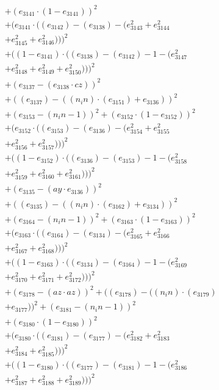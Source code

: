 \documentclass[10pt, a4paper]{article}
\begin{document}
\begin{small}
\begin{align*}
& + (e_{3141}  \cdot  (1 - e_{3141}))^{2} \\
& + (e_{3141}  \cdot  ((e_{3142}) - (e_{3138}) - (e_{3143}^{2} + e_{3144}^{2} \\
& + e_{3145}^{2} + e_{3146}^{2})))^{2} \\
& + ((1 - e_{3141})  \cdot  ((e_{3138}) - (e_{3142}) - 1 - (e_{3147}^{2} \\
& + e_{3148}^{2} + e_{3149}^{2} + e_{3150}^{2})))^{2} \\
& + (e_{3137} - (e_{3138}  \cdot  cz))^{2} \\
& + ((e_{3137}) - ((n_in)  \cdot  (e_{3151}) + e_{3136}))^{2} \\
& + (e_{3153} - (n_in - 1))^{2} + (e_{3152}  \cdot  (1 - e_{3152}))^{2} \\
& + (e_{3152}  \cdot  ((e_{3153}) - (e_{3136}) - (e_{3154}^{2} + e_{3155}^{2} \\
& + e_{3156}^{2} + e_{3157}^{2})))^{2} \\
& + ((1 - e_{3152})  \cdot  ((e_{3136}) - (e_{3153}) - 1 - (e_{3158}^{2} \\
& + e_{3159}^{2} + e_{3160}^{2} + e_{3161}^{2})))^{2} \\
& + (e_{3135} - (ay  \cdot  e_{3136}))^{2} \\
& + ((e_{3135}) - ((n_in)  \cdot  (e_{3162}) + e_{3134}))^{2} \\
& + (e_{3164} - (n_in - 1))^{2} + (e_{3163}  \cdot  (1 - e_{3163}))^{2} \\
& + (e_{3163}  \cdot  ((e_{3164}) - (e_{3134}) - (e_{3165}^{2} + e_{3166}^{2} \\
& + e_{3167}^{2} + e_{3168}^{2})))^{2} \\
& + ((1 - e_{3163})  \cdot  ((e_{3134}) - (e_{3164}) - 1 - (e_{3169}^{2} \\
& + e_{3170}^{2} + e_{3171}^{2} + e_{3172}^{2})))^{2} \\
& + (e_{3178} - (az  \cdot  az))^{2} + ((e_{3178}) - ((n_in)  \cdot  (e_{3179}) \\
& + e_{3177}))^{2} + (e_{3181} - (n_in - 1))^{2} \\
& + (e_{3180}  \cdot  (1 - e_{3180}))^{2} \\
& + (e_{3180}  \cdot  ((e_{3181}) - (e_{3177}) - (e_{3182}^{2} + e_{3183}^{2} \\
& + e_{3184}^{2} + e_{3185}^{2})))^{2} \\
& + ((1 - e_{3180})  \cdot  ((e_{3177}) - (e_{3181}) - 1 - (e_{3186}^{2} \\
& + e_{3187}^{2} + e_{3188}^{2} + e_{3189}^{2})))^{2} \\

\end{align*}
\end{small}
\end{document}
